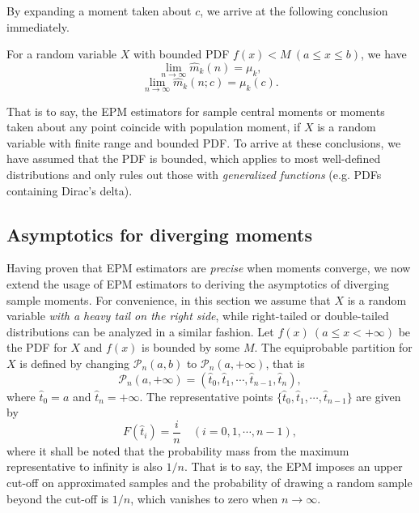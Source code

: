 By expanding a moment taken about $ c $, we arrive at the following conclusion immediately. 
\begin{lemma}
For a random variable $ X $ with bounded PDF $ f(x) < M \ (a \leq x \leq b) $, we have 
\begin{equation}
\lim_{n \rightarrow \infty}{\hat{m}_k (n)} = \mu_k,
\end{equation}
\begin{equation}
\lim_{n \rightarrow \infty}{\hat{m}_k (n;c)} = \mu_k(c).
\end{equation}
\end{lemma}
That is to say, the EPM estimators for sample central moments or moments taken about any point coincide with population moment, if $ X $ is a random variable with finite range and bounded PDF. To arrive at these conclusions, we have assumed that the PDF is bounded, which applies to most well-defined distributions and only rules out those with \textit{generalized functions} (e.g. PDFs containing Dirac's delta).

\subsection{Asymptotics for diverging moments}
Having proven that EPM estimators are \textit{precise} when moments converge, we now extend the usage of EPM estimators to deriving the asymptotics of diverging sample moments. For convenience, in this section we assume that $ X $ is a random variable \textit{with a heavy tail on the right side}, while right-tailed or double-tailed distributions can be analyzed in a similar fashion. Let $ f(x) \ (a \leq x < +\infty) $ be the PDF for $ X $ and $ f(x)$ is bounded by some $ M $. The equiprobable partition for $ X $ is defined by changing $ \mathcal{P}_n(a,b) $ to $ \mathcal{P}_n(a, +\infty) $, that is
\begin{equation}
\mathcal{P}_n(a, +\infty) = (\hat{t}_0, \hat{t}_1, \cdots, \hat{t}_{n-1}, \hat{t}_n),
\end{equation}
where $ \hat{t}_0=a $ and $ \hat{t}_{n}=+\infty $. The representative points $ \{\hat{t}_0, \hat{t}_1, \cdots, \hat{t}_{n-1}\} $ are given by 
\begin{equation}
F(\hat{t}_i) = \frac{i}{n} \quad (i=0,1,\cdots,n-1),
\end{equation}
where it shall be noted that the probability mass from the maximum representative to infinity is also $ 1/n $. That is to say, the EPM imposes an upper cut-off on approximated samples and the probability of drawing a random sample beyond the cut-off is $ 1/n $, which vanishes to zero when $ n \rightarrow \infty $. 
  
